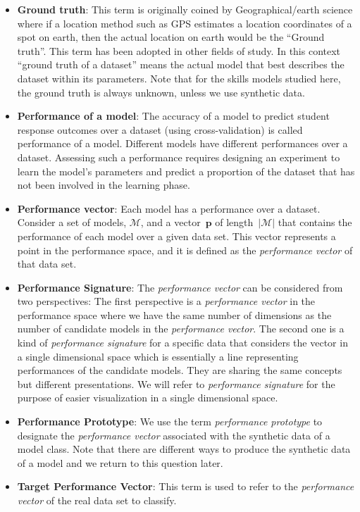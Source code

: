 \begin{itemize}
\item \textbf{Ground truth}: This term is originally coined by Geographical/earth science where if a location method such as GPS estimates a location coordinates of a spot on earth, then the actual location on earth would be the ``Ground truth''. This term has been adopted in other fields of study. In this context ``ground truth of a dataset'' means the actual model that best describes the dataset within its parameters. Note that for the skills models studied here, the ground truth is always unknown, unless we use synthetic data.
\item \textbf{Performance of a model}: The accuracy of a model to predict student response outcomes over a dataset (using cross-validation) is called performance of a model. Different models have different performances over a dataset. Assessing such a performance requires designing an experiment to learn the model's parameters and predict a proportion of the dataset that has not been involved in the learning phase.
\item \textbf{Performance vector}: Each model has a performance over a dataset. Consider a set of models, $\mathcal{M}$, and a vector~$\mathbf{p}$ of length~$|\mathcal{M}|$ that contains the performance of each model over a given data set. This vector represents a point in the performance space, and it is defined as the \textit{performance vector} of that data set.

\item \textbf{Performance Signature}: The \textit{performance vector} can be considered from two perspectives: The first perspective is a \textit{performance vector} in the performance space where we have the same number of dimensions as the number of candidate models in the \textit{performance vector}. The second one is a kind of \textit{performance signature} for a specific data that considers the vector in a single dimensional space which is essentially a line representing performances of the candidate models. They are sharing the same concepts but different presentations. We will refer to \textit{performance signature} for the purpose of easier visualization in a single dimensional space.

\item \textbf{Performance Prototype}: We use the term \textit{performance prototype} to designate the \textit{performance vector} associated with the synthetic data of a model class. Note that there are different ways to produce the synthetic data of a model and we return to this question later.

\item \textbf{Target Performance Vector}: This term is used to refer to the \textit{performance vector} of the real data set to classify.


\end{itemize}

